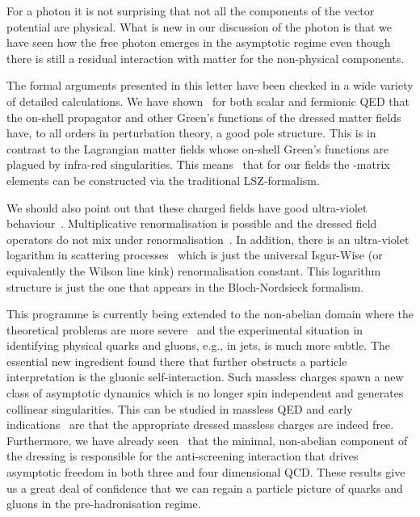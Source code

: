 \documentclass[12pt,a4paper]{article}
\begin{document}
For a photon it is not  surprising that not all the components of the
vector potential are physical. What is new in our discussion of
the photon is that we have
seen how the free photon emerges in the asymptotic regime even though there
is still a residual interaction with matter for the
non-physical components.


The formal arguments presented in this letter have been checked in
a wide variety of detailed calculations. We have
shown~\cite{Bagan:1998kg,Bagan:1999jk}
for both scalar and fermionic QED that the on-shell propagator and
other Green's functions of the dressed matter fields have, to all
orders in perturbation theory, a good
pole structure. This is in contrast to the Lagrangian matter fields whose
on-shell Green's functions are plagued by infra-red singularities.
This means~\cite{Bagan:1999jf} that for our fields the \coordHE{}-matrix
elements can be constructed via the traditional LSZ-formalism.

We should also point out that these charged fields have good
ultra-violet behaviour~\cite{Bagan:1997su,Bagan:1999jk}.
Multiplicative renormalisation is possible and the dressed field
operators do
not mix under renormalisation~\cite{Bagan:1999jk}. In addition,
there is an ultra-violet logarithm in scattering
processes~\cite{Bagan:1999jk} which is just the universal
Isgur-Wise (or equivalently the Wilson line kink) renormalisation
constant. This logarithm structure is just the one that appears
in the Bloch-Nordsieck formalism.

This programme is currently being extended to the non-abelian
domain where the theoretical problems are more
severe~\cite{Ciafaloni:1989vs,buchholz:1996} and the
experimental situation in identifying physical quarks and gluons,
e.g., in jets, is much more subtle.
The essential new ingredient found there that further obstructs a
particle interpretation is the gluonic self-interaction. Such
massless charges spawn a new class of asymptotic  dynamics which
is no longer spin independent and generates collinear
singularities. This can be studied in massless QED and early
indications~\cite{Horan:1998im} are that the appropriate dressed
massless charges are indeed free. Furthermore, we have already
seen~\cite{Lavelle:1998dv} that the minimal, non-abelian component
of the dressing is responsible for the anti-screening interaction
that drives asymptotic freedom in both three and four
dimensional QCD. These results give us a great deal of confidence
that we can regain a particle picture of quarks and gluons in the
pre-hadronisation regime.
\end{document}
